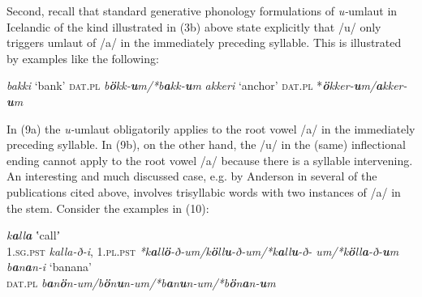 \documentclass[output=paper,
modfonts
]{LSP/langsci}
\begin{document}
Second, recall that standard generative phonology formulations of
\emph{u-}umlaut in Icelandic of the kind illustrated in (3b) above state
explicitly that /u/ only triggers umlaut of /a/ in the immediately
preceding syllable. This is illustrated by examples like the following:

\ea
	\ea	\emph{bakki} `bank' \textsc{dat.pl}
		\emph{b\textbf{ö}kk-\textbf{u}m/*b\textbf{a}kk-\textbf{u}m}
	\ex	\emph{akkeri} `anchor' \textsc{dat.pl}
		*\emph{\textbf{ö}kker-\textbf{u}m/\textbf{a}kker-\textbf{u}m}
	\z
\z

\noindent In (9a) the \emph{u-}umlaut obligatorily applies to the root vowel /a/
in the immediately preceding syllable. In (9b), on the other hand, the
/u/ in the (same) inflectional ending cannot apply to the root vowel /a/
because there is a syllable intervening. An interesting and much
discussed case, e.g. by Anderson in several of the publications cited
above, involves trisyllabic words with two instances of /a/ in the stem.
Consider the examples in (10):

\ea
	\ea	\emph{k\textbf{a}ll\textbf{a}} ʽcallʼ\\
		\textsc{1.sg.pst} \emph{kalla-ð-i}, \textsc{1.pl.pst}
		\emph{*k\textbf{a}ll\textbf{ö}-ð-um/k\textbf{ö}ll\textbf{u}-ð-um/*k\textbf{a}ll\textbf{u}-ð-		um/*k\textbf{ö}ll\textbf{a}-ð-\textbf{u}m}
	\ex	\emph{b\textbf{a}n\textbf{a}n-i} `banana'\\
		\textsc{dat.pl} \emph{b\textbf{a}n\textbf{ö}n-um/b\textbf{ö}n\textbf{u}n-um/*b\textbf{a}n\textbf{u}n-um/*b\textbf{ö}n\textbf{a}n-\textbf{u}m}
	\z
\z
\end{document}
